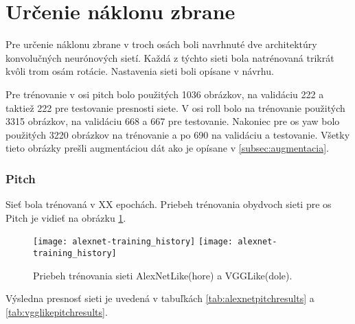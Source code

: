
\section{Určenie náklonu zbrane}
Pre určenie náklonu zbrane v troch osách boli navrhnuté dve architektúry konvolučných neurónových sietí.
Každá z týchto sieti bola natrénovaná trikrát kvôli trom osám rotácie.
Nastavenia sieti boli opísane v návrhu.

Pre trénovanie v osi pitch bolo použitých 1036 obrázkov, na validáciu 222 a taktiež 222 pre testovanie presnosti siete.
V osi roll bolo na trénovanie použitých 3315 obrázkov, na validáciu 668 a 667 pre testovanie.
Nakoniec pre os yaw bolo použitých 3220 obrázkov na trénovanie a po 690 na validáciu a testovanie.
Všetky tieto obrázky prešli augmentáciou dát ako je opísane v \ref{subsec:augmentacia}.

\subsubsection{Pitch}
Sieť bola trénovaná v XX epochách.
Priebeh trénovania obydvoch sieti pre os Pitch je vidieť na obrázku \ref{pic:pitchaxis}.

\begin{figure}[H]
    \centering
    \texttt{[image: alexnet-training\_history]} %
    \quad
	\texttt{[image: alexnet-training\_history]} %
	\caption{Priebeh trénovania sieti AlexNetLike(hore) a VGGLike(dole).}
	\label{pic:pitchaxis}
\end{figure}

Výsledna presnosť sieti je uvedená v tabuľkách \ref{tab:alexnetpitchresults} a \ref{tab:vgglikepitchresults}.

